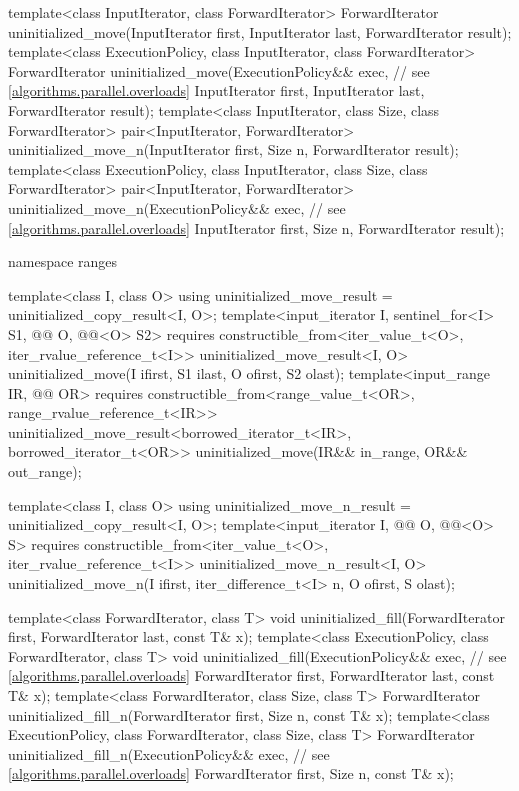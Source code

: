 \begin{codeblock}
{  template<class InputIterator, class ForwardIterator>
    ForwardIterator uninitialized_move(InputIterator first, InputIterator last,
                                       ForwardIterator result);
  template<class ExecutionPolicy, class InputIterator, class ForwardIterator>
    ForwardIterator uninitialized_move(ExecutionPolicy&& exec,  // see \ref{algorithms.parallel.overloads}
                                       InputIterator first, InputIterator last,
                                       ForwardIterator result);
  template<class InputIterator, class Size, class ForwardIterator>
    pair<InputIterator, ForwardIterator> uninitialized_move_n(InputIterator first, Size n,
                                                              ForwardIterator result);
  template<class ExecutionPolicy, class InputIterator, class Size, class ForwardIterator>
    pair<InputIterator, ForwardIterator>
      uninitialized_move_n(ExecutionPolicy&& exec,              // see \ref{algorithms.parallel.overloads}
                           InputIterator first, Size n, ForwardIterator result);

  namespace ranges {
    template<class I, class O>
      using uninitialized_move_result = uninitialized_copy_result<I, O>;
    template<input_iterator I, sentinel_for<I> S1,
             @@ O, @@<O> S2>
      requires constructible_from<iter_value_t<O>, iter_rvalue_reference_t<I>>
        uninitialized_move_result<I, O>
          uninitialized_move(I ifirst, S1 ilast, O ofirst, S2 olast);
    template<input_range IR, @@ OR>
      requires constructible_from<range_value_t<OR>, range_rvalue_reference_t<IR>>
        uninitialized_move_result<borrowed_iterator_t<IR>, borrowed_iterator_t<OR>>
          uninitialized_move(IR&& in_range, OR&& out_range);

    template<class I, class O>
      using uninitialized_move_n_result = uninitialized_copy_result<I, O>;
    template<input_iterator I,
             @@ O, @@<O> S>
      requires constructible_from<iter_value_t<O>, iter_rvalue_reference_t<I>>
        uninitialized_move_n_result<I, O>
          uninitialized_move_n(I ifirst, iter_difference_t<I> n, O ofirst, S olast);
  }

  template<class ForwardIterator, class T>
    void uninitialized_fill(ForwardIterator first, ForwardIterator last, const T& x);
  template<class ExecutionPolicy, class ForwardIterator, class T>
    void uninitialized_fill(ExecutionPolicy&& exec,             // see \ref{algorithms.parallel.overloads}
                            ForwardIterator first, ForwardIterator last, const T& x);
  template<class ForwardIterator, class Size, class T>
    ForwardIterator uninitialized_fill_n(ForwardIterator first, Size n, const T& x);
  template<class ExecutionPolicy, class ForwardIterator, class Size, class T>
    ForwardIterator uninitialized_fill_n(ExecutionPolicy&& exec,        // see \ref{algorithms.parallel.overloads}
                                         ForwardIterator first, Size n, const T& x);

}
\end{codeblock}
